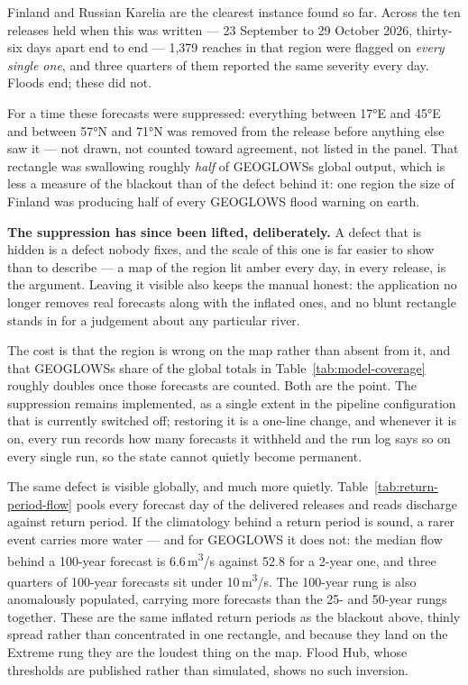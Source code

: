 Finland and Russian Karelia are the clearest instance found so far.
Across the ten releases held when this was written --- 23 September to 29 October 2026, thirty-six days apart end to end --- 1,379 reaches in that region were flagged on \emph{every single one}, and three quarters of them reported the same severity every day.
Floods end; these did not.

For a time these forecasts were suppressed: everything between 17°E and 45°E and between 57°N and 71°N was removed from the release before anything else saw it --- not drawn, not counted toward agreement, not listed in the panel.
That rectangle was swallowing roughly \emph{half} of GEOGLOWS\textquotesingle s global output, which is less a measure of the blackout than of the defect behind it: one region the size of Finland was producing half of every GEOGLOWS flood warning on earth.

\textbf{The suppression has since been lifted, deliberately.}
A defect that is hidden is a defect nobody fixes, and the scale of this one is far easier to show than to describe --- a map of the region lit amber every day, in every release, is the argument.
Leaving it visible also keeps the manual honest: the application no longer removes real forecasts along with the inflated ones, and no blunt rectangle stands in for a judgement about any particular river.

The cost is that the region is wrong on the map rather than absent from it, and that GEOGLOWS\textquotesingle s share of the global totals in Table~\ref{tab:model-coverage} roughly doubles once those forecasts are counted.
Both are the point.
The suppression remains implemented, as a single extent in the pipeline configuration that is currently switched off; restoring it is a one-line change, and whenever it is on, every run records how many forecasts it withheld and the run log says so on every single run, so the state cannot quietly become permanent.

The same defect is visible globally, and much more quietly.
Table~\ref{tab:return-period-flow} pools every forecast day of the delivered releases and reads discharge against return period.
If the climatology behind a return period is sound, a rarer event carries more water --- and for GEOGLOWS it does not: the median flow behind a 100-year forecast is 6.6\,m\textsuperscript{3}/s against 52.8 for a 2-year one, and three quarters of 100-year forecasts sit under 10\,m\textsuperscript{3}/s.
The 100-year rung is also anomalously populated, carrying more forecasts than the 25- and 50-year rungs together.
These are the same inflated return periods as the blackout above, thinly spread rather than concentrated in one rectangle, and because they land on the Extreme rung they are the loudest thing on the map.
Flood Hub, whose thresholds are published rather than simulated, shows no such inversion.

